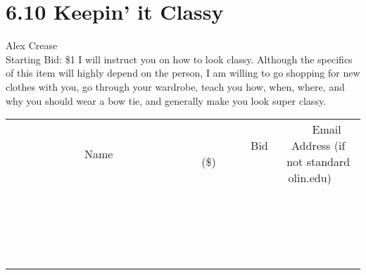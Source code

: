 \documentclass[11pt]{article}
\begin{document}
\section*{6.10 Keepin' it Classy}
Alex Crease
\\
Starting Bid: \$1
\newline
I will instruct you on how to look classy. Although the specifics of this item will highly depend on the person, I am willing to go shopping for new clothes with you, go through your wardrobe, teach you how, when, where, and why you should wear a bow tie, and generally make you look super classy.
\\[3ex]
\begin{tabular}{c c c}
~~~~~~~~~~~~~Name~~~~~~~~~~~~~ & ~~~~~~~~~Bid (\$)~~~~~~~~~  & ~~~Email Address (if not standard olin.edu)~~~\\
 & & \\
\hline
 & & \\
\hline
 & & \\
\hline
 & & \\
\hline
 & & \\
\hline
 & & \\
\hline
 & & \\
\hline
 & & \\
\hline
 & & \\
\hline
 & & \\
\hline
 & & \\
\hline
 & & \\
\hline
 & & \\
\hline
 & & \\
\hline
 & & \\
\hline
 & & \\
\hline
 & & \\
\hline
 & & \\
\hline
 & & \\
\hline
\end{tabular}
\newpage
\end{document}
